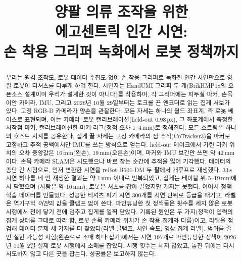 \documentclass[conference,10pt]{IEEEtran}
\newcommand{\mm}{\,mm\xspace}
\begin{document}
\title{양팔 의류 조작을 위한\\에고센트릭 인간 시연:\\[1mm]\Large 손 착용 그리퍼 녹화에서 로봇 정책까지}
\author{
}
\maketitle

\begin{abstract}
우리는 원격 조작도, 로봇 데이터 수집도 없이 손 착용 그리퍼로 녹화한 인간 시연만으로 양팔 로봇이 티셔츠를 다루게 하려 한다.
시연자는 HandUMI 그리퍼 두 개(BrikHMP18의 오픈소스 설계이며 우리가 설계한 것이 아니다)를 착용하며, 각 그리퍼에는 피두셜
마커, 손목 어안 카메라, IMU, 그리고 2026년 10월 29일부터는 토크를 끈 엔코더로 읽는 집게 서보가 있다. 고정 RGB-D 카메라가 양손을
관찰한다. 모든 자세는 하나의 월드 좌표계, 즉 로봇 베이스로 표현되며, 이는 카메라--로봇 캘리브레이션(held-out 0.98\,px), 그
좌표계에서 측정한 시작점 마커, 캘리브레이션한 마커 리그(정적 오차 1--4\mm)로 정해진다. 모든 스트림은 하나의 호스트 시계를
공유한다. 집게 끝 자세는 고정 카메라의 점 추적(CoTracker3)을 마커로 고정하고 추적 공백에서만 IMU를 쓰는 방식으로 얻는다.
held-out 테이크에서 가린 마커 위치의 오차 중앙값은 16\mm(왼손), 19\mm(오른손)이며, 마커와 IMU 보간만 쓰면 약 42\mm{}이다. 손목
카메라 SLAM은 시도했으나 바로 잡는 순간에 추적을 잃어 기각했다. 데이터의 종단 간 시험으로, 먼저 변환한 시연을 reBot B601-DM 두
팔에서 개루프로 재생했다. 33\,s 시연 하나를 네 번 재생한 결과는 약 1\mm 이내로 반복되었고, 집게는 테이블 위 5--19\mm{}에서 닫혔으며
(사람은 약 10\mm), 로봇은 셔츠를 잡아 끌었지만 개지는 못했다. 이어서 정책 학습 데이터를 만들었다. 성공한 티셔츠 펴기 시연 300개를
시연 단위로 등급을 매기고, 라벨은 역기구학 \emph{이전}의 값을 클램프 없이 쓴다. 파인튜닝한 첫 정책들은 횟수를 세지 않은 로봇
시행에서 천에 닿기 전에 멈추고 집게를 일찍 닫았다. 기록된 원인은 두 가지(정책이 입력의 집게 상태를 그대로 따라 함, 로봇 손목
카메라 위치가 손 착용 집게와 다름)이고, 라벨을 점검해 데이터 문제 세 가지를 더 찾았다(라벨 클램프, 시연 속도, 영상 집게 라벨).
범위를 줄인 실현 가능성 시험(왼손으로 소매 하나 집기)에서는 시연 197개로 파인튜닝한 정책이 2026년 11월 2일 실제 로봇 시행에서
소매를 잡았다. 시행 횟수는 세지 않았고, 놓친 뒤에는 다시 시도하지 않고 다른 곳을 잡는다. 성공률은 보고하지 않는다.
\end{abstract}
\end{document}
